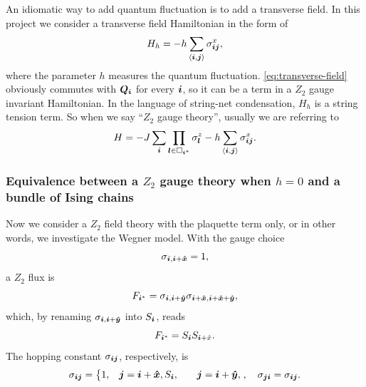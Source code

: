 \documentclass[hyperref, a4paper]{article}
\newcommand*{\pair}[1]{\langle #1 \rangle}
\newcommand*{\Ztwo}{\texorpdfstring{$\mathbb{Z}_2$ }{Z2 }}
\def\\{}%
\def\mathbb#1{#1}%
\begin{document}
An idiomatic way to add quantum fluctuation is to add a transverse field.
In this project we consider a transverse field Hamiltonian in the form of 
\begin{equation}
    H_h = - h \sum_{\pair{\vb*{i}, \vb*{j}}} \sigma_{\vb*{i} \vb*{j}}^x ,
    \label{eq:transverse-field}
\end{equation}
where the parameter $h$ measures the quantum fluctuation.
\eqref{eq:transverse-field} obviously commutes with $\vb*{Q}_{\vb*{i}}$ for every $\vb*{i}$, so it can be a term in a \Ztwo gauge invariant Hamiltonian. 
In the language of string-net condensation, $H_h$ is a string tension term.
So when we say ``\Ztwo gauge theory'', usually we are referring to 
\begin{equation}
    H = - J \sum_{\vb*{i}} \prod_{\vb*{l} \in \Box_{\vb*{i}^*}} \sigma^z_{\vb*{l}} - h \sum_{\pair{\vb*{i}, \vb*{j}}} \sigma_{\vb*{i} \vb*{j}}^x.
    \label{eq:standard-z2-theory}
\end{equation}

\subsubsection{Equivalence between a \Ztwo gauge theory when $h = 0$ and a bundle of Ising chains}

Now we consider a \Ztwo field theory with the plaquette term only, or in other words, we investigate the Wegner model.
With the gauge choice
\begin{equation}
    \sigma_{\vb*{i}, \vb*{i}+\vu*{x}} = 1,
    \label{eq:gauge-choice-x}
\end{equation}
a \Ztwo flux is 
\begin{equation}
    F_{\vb*{i}^*} = \sigma_{\vb*{i}, \vb*{i}+\vu*{y}} \sigma_{\vb*{i}+\vu*{x}, \vb*{i} + \vu*{x} + \vu*{y}},
\end{equation}
which, by renaming $\sigma_{\vb*{i}, \vb*{i}+\vu*{y}}$ into $S_{\vb*{i}}$, reads 
\begin{equation}
    F_{\vb*{i}^*} = S_{\vb*{i}} S_{\vb*{i}+\hat{x}}.
\end{equation}
The hopping constant $\sigma_{\vb*{i} \vb*{j}}$, respectively, is
\begin{equation}
    \sigma_{\vb*{i} \vb*{j}} = \left\{
    \begin{aligned}
        1, &\quad \vb*{j} = \vb*{i} + \vu*{x}, \\
        S_{\vb*{i}}, &\quad \vb*{j} = \vb*{i} + \vu*{y},
    \end{aligned}
\right., \quad \sigma_{\vb*{j} \vb*{i}} = \sigma_{\vb*{i} \vb*{j}}.
\end{equation}
\end{document}

